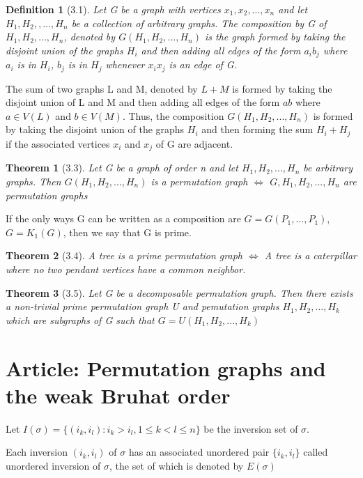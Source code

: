\documentclass{article}
\newtheorem*{definition}{Definition}
\newtheorem*{theorem}{Theorem}
\begin{document}
\begin{definition}[3.1]
    Let G be a graph with vertices $x_1, x_2, ..., x_n$ and let $H_1, H_2, ,..., H_n$ be a collection of arbitrary graphs. The composition by G of $H_1, H_2, ..., H_n$, denoted by $G(H_1, H_2, ..., H_n)$ is the graph formed by taking the disjoint union of the graphs $H_i$ and then adding all edges of the form $a_ib_j$ where $a_i$ is in $H_i$, $b_j$ is in $H_j$ whenever $x_ix_j$ is an edge of G.
\end{definition}

The sum of two graphs L and M, denoted by $L + M$ is formed by taking the disjoint union of L and M and then adding all edges of the form $ab$ where $a \in V(L)$ and $b \in V(M)$. Thus, the composition $G(H_1, H_2, ..., H_n)$ is formed by taking the disjoint union of the graphs $H_i$ and then forming the sum $H_i + H_j$ if the associated vertices $x_i$ and $x_j$ of G are adjacent.

\begin{theorem}[3.3]
    Let G be a graph of order n and let $H_1, H_2, ..., H_n$ be arbitrary graphs. Then $G(H_1, H_2, ..., H_n)$ is a permutation graph $\Leftrightarrow$ $G, H_1, H_2, ..., H_n$ are permutation graphs
\end{theorem}

If the only ways G can be written as a composition are $G = G(P_1,...,P_1)$, $G = K_1(G)$, then we say that G is prime.

\begin{theorem}[3.4]
    A tree is a prime permutation graph $\Leftrightarrow$ A tree is a caterpillar where no two pendant vertices have a common neighbor.
\end{theorem}

\begin{theorem}[3.5]
    Let G be a decomposable permutation graph. Then there exists a non-trivial prime permutation graph U and pemutation graphs $H_1, H_2, ..., H_k$ which are subgraphs of G such that $G = U(H_1, H_2, ..., H_k)$
\end{theorem}
\section { Article: Permutation graphs and the weak Bruhat order }

Let $I(\sigma) = \{ (i_k,i_l): i_k > i_l, 1 \leq k < l \leq n \}$ be the inversion set of $\sigma$.

Each inversion $(i_k, i_l)$ of $\sigma$ has an associated unordered pair $\{ i_k, i_l \}$ called unordered inversion of $\sigma$, the set of which is denoted by $E(\sigma)$
\end{document}
